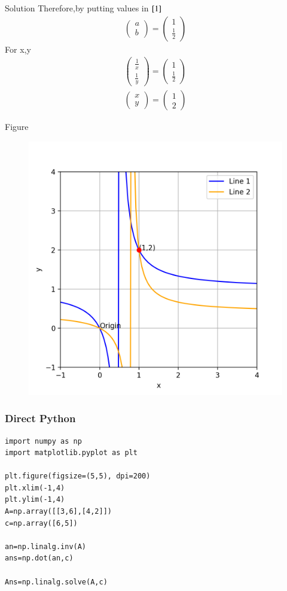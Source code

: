 \documentclass{beamer}
\begin{document}
\begin{frame}{Solution}
Therefore,by putting values in $\eqref{1}$
\begin{align}
    \begin{pmatrix}a\\b\end{pmatrix}=\begin{pmatrix}1 \\ \frac{1}{2}\end{pmatrix}
\end{align}
For x,y
\begin{align}
    \begin{pmatrix}\frac{1}{x}\\\frac{1}{y}\end{pmatrix}=\begin{pmatrix}1 \\ \frac{1}{2}\end{pmatrix}\\
    \begin{pmatrix}x\\y\end{pmatrix}=\begin{pmatrix}1 \\ 2\end{pmatrix}
\end{align}
\end{frame}
\begin{frame}{Figure}
    \begin{figure}[H]
        \centering
        \includegraphics[width=0.6\columnwidth]{figs/figure.png}
        \caption{}
        \label{fig:placeholder}
    \end{figure}
\end{frame}
\begin{frame}[fragile]
\frametitle{Direct Python}
\begin{lstlisting}
import numpy as np
import matplotlib.pyplot as plt

plt.figure(figsize=(5,5), dpi=200)
plt.xlim(-1,4)
plt.ylim(-1,4)
A=np.array([[3,6],[4,2]])
c=np.array([6,5])

an=np.linalg.inv(A)
ans=np.dot(an,c)

Ans=np.linalg.solve(A,c)
\end{lstlisting}
\end{frame}
\end{document}
